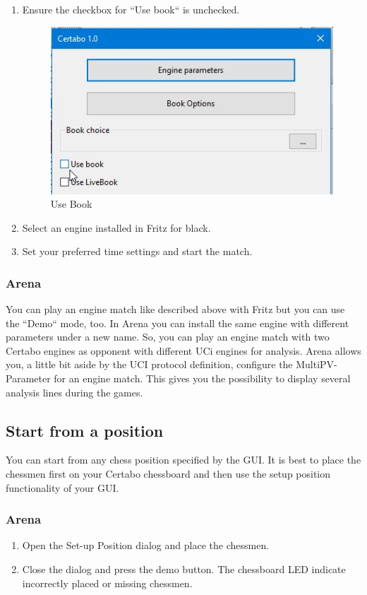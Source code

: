 \documentclass[11pt,a4paper]{article}
\begin{document}
\begin{enumerate}
	\item Ensure the checkbox for ``Use book`` is unchecked.
	\begin{figure}[H]
		\centering
		\includegraphics[scale=0.6]{fritz_engineusebook.jpg}
		\caption{Use Book}
		\label{fig:FritzUseBook}
	\end{figure}
	\item Select an engine installed in Fritz for black.
	\item Set your preferred time settings and start the match.	
\end{enumerate}
\subsubsection{Arena}
You can play an engine match like described above with Fritz but you can use the ``Demo`` mode, too. In Arena you can install the same engine with different parameters under a new name. So, you can play an engine match with two Certabo engines as opponent with different UCi engines for analysis. Arena allows you, a little bit aside by the UCI protocol definition, configure the MultiPV-Parameter for an engine match. This gives you the possibility to display several analysis lines during the games.

\subsection{Start from a position}
You can start from any chess position specified by the GUI. It is best to place the chessmen first on your Certabo chessboard and then use the setup position functionality of your GUI.
\subsubsection{Arena}
\begin{enumerate}
  \item Open the Set-up Position dialog and place the chessmen.
  \item Close the dialog and press the demo button. The chessboard LED indicate incorrectly placed or missing chessmen.
\end{enumerate}
\end{document}
